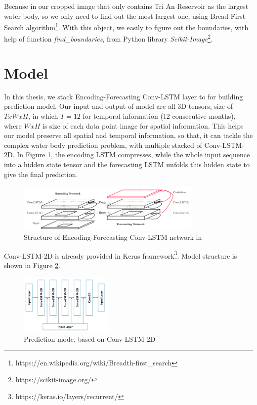 Because in our cropped image that only contains Tri An Reservoir as the largest water body, so we only need to find out the most largest one, using Bread-First Search algorithm\footnote{https://en.wikipedia.org/wiki/Breadth-first\_search}. With this object, we easily to figure out the boundaries, with help of function \textit{find\_boundaries}, from Python library \textit{Scikit-Image}\footnote{https://scikit-image.org/}.

\section{Model}

In this thesis, we stack Encoding-Forecasting Conv-LSTM layer to for building prediction model. Our input and output of model are all 3D tensors, size of $T x W x H$, in which $T = 12$ for temporal information (12 consecutive months), where $W x H$ is size of each data point image for spatial information. This helps our model preserve all spatial and temporal information, so that, it can tackle the complex water body prediction problem, with multiple stacked of Conv-LSTM-2D. In Figure \ref{fig:structureConvLSTM2D}, the encoding LSTM compresses, while the whole input sequence into a hidden state tensor and the forecasting LSTM unfolds this hidden state to give the final prediction.

\begin{figure}[h!]
	\centering
	\includegraphics[width=0.8\textwidth]{figures/convlstm_sample.PNG}
	\caption[]{Structure of Encoding-Forecasting Conv-LSTM network in \cite{Shi2015ConvolutionalLN}}
	\label{fig:structureConvLSTM2D}
\end{figure}

Conv-LSTM-2D is already provided in Keras framework\footnote{https://keras.io/layers/recurrent/}. Model structure is shown in Figure \ref{fig:timeModel}.

\begin{figure}[h!]
	\centering
	\includegraphics[width=0.4\textwidth]{figures/time_model.png}
	\caption[]{Prediction mode, based on Conv-LSTM-2D}
	\label{fig:timeModel}
\end{figure}

